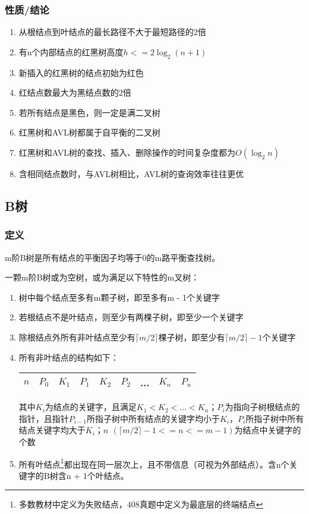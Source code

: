\subsubsection{性质/结论}
\begin{enumerate}
    \item 从根结点到叶结点的最长路径不大于最短路径的2倍
    \item 有n个内部结点的红黑树高度\(h <= 2\log_2(n + 1)\)
    \item 新插入的红黑树的结点初始为红色
    \item 红结点数最大为黑结点数的2倍
    \item 若所有结点是黑色，则一定是满二叉树
    \item 红黑树和AVL树都属于自平衡的二叉树
    \item 红黑树和AVL树的查找、插入、删除操作的时间复杂度都为\(O(\log_2n)\)
    \item 含相同结点数时，与AVL树相比，AVL树的查询效率往往更优
\end{enumerate}


\subsection{B树}\label{B树}

\subsubsection{定义}
m阶B树是所有结点的平衡因子均等于0的m路平衡查找树。

一颗m阶B树或为空树，或为满足以下特性的m叉树：
\begin{enumerate}
    \item 树中每个结点至多有m颗子树，即至多有m - 1个关键字
    \item 若根结点不是叶结点，则至少有两棵子树，即至少一个关键字
    \item 除根结点外所有非叶结点至少有\(\lceil m / 2\rceil\)棵子树，即至少有\(\lceil m / 2\rceil - 1\)个关键字
    \item 所有非叶结点的结构如下：\begin{center}
        \begin{tabular}{|c|c|c|c|c|c|c|c|c|}
            \hline
            \(n\) & \(P_0\) & \(K_1\) & \(P_1\) & \(K_2\) & \(P_2\) & ... & \(K_n\) & \(P_n\) \\ 
            \hline
        \end{tabular}
    \end{center}其中\(K_i\)为结点的关键字，且满足\(K_1 < K_2 < ... < K_n\)；\(P_i\)为指向子树根结点的指针，且指针\(P_{i - 1}\)所指子树中所有结点的关键字均小于\(K_i\)，\(P_i\)所指子树中所有结点关键字均大于\(K_i\)；\(n\,\ (\lceil m / 2\rceil - 1 <= n <= m - 1)\)为结点中关键字的个数
    \item 所有叶结点\footnote{多数教材中定义为失败结点，408真题中定义为最底层的终端结点}都出现在同一层次上，且不带信息（可视为外部结点）。含n个关键字的B树含n + 1个叶结点。
\end{enumerate}


